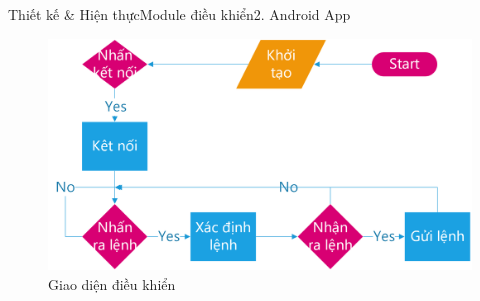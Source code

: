 \documentclass[compress, blue, 13pt,hyperref={pdfpagemode=FullScreen}]{beamer}
\begin{document}
\begin{frame}{Thiết kế \& Hiện thực}{Module điều khiển}{2. Android App}
\begin{figure}[hbtp]
\includegraphics[scale=0.43]{images/flowchart_app.png}
\caption{Giao diện điều khiển}
\end{figure}
\end{frame}
\end{document}
